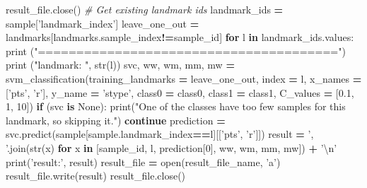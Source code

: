 \documentclass[10pt,letterpaper]{article}
\newenvironment{Shaded}{\begin{snugshade}}{\end{snugshade}}
\newcommand{\DecValTok}[1]{\textcolor[rgb]{0.00,0.00,0.81}{{#1}}}
\newcommand{\FloatTok}[1]{\textcolor[rgb]{0.00,0.00,0.81}{{#1}}}
\newcommand{\CharTok}[1]{\textcolor[rgb]{0.31,0.60,0.02}{{#1}}}
\newcommand{\StringTok}[1]{\textcolor[rgb]{0.31,0.60,0.02}{{#1}}}
\newcommand{\CommentTok}[1]{\textcolor[rgb]{0.56,0.35,0.01}{\textit{{#1}}}}
\newcommand{\VariableTok}[1]{\textcolor[rgb]{0.00,0.00,0.00}{{#1}}}
\newcommand{\ControlFlowTok}[1]{\textcolor[rgb]{0.13,0.29,0.53}{\textbf{{#1}}}}
\newcommand{\OperatorTok}[1]{\textcolor[rgb]{0.81,0.36,0.00}{\textbf{{#1}}}}
\newcommand{\BuiltInTok}[1]{{#1}}
\newcommand{\NormalTok}[1]{{#1}}
\begin{document}
\begin{Shaded}
\begin{Highlighting}[]
    \NormalTok{result_file.close()}
    \CommentTok{# Get existing landmark ids}
    \NormalTok{landmark_ids }\OperatorTok{=} \NormalTok{sample[}\StringTok{'landmark_index'}\NormalTok{]}
    \NormalTok{leave_one_out }\OperatorTok{=} \NormalTok{landmarks[landmarks.sample_index}\OperatorTok{!=}\NormalTok{sample_id]}
    \ControlFlowTok{for} \NormalTok{l }\OperatorTok{in} \NormalTok{landmark_ids.values:}
        \BuiltInTok{print} \NormalTok{(}\StringTok{"======================================="}\NormalTok{)}
        \BuiltInTok{print} \NormalTok{(}\StringTok{"landmark: "}\NormalTok{, }\BuiltInTok{str}\NormalTok{(l))}
        \NormalTok{svc, ww, wm, mm, mw }\OperatorTok{=} \NormalTok{svm_classification(training_landmarks }\OperatorTok{=} \NormalTok{leave_one_out,}
                                                 \NormalTok{index }\OperatorTok{=} \NormalTok{l,}
                                                 \NormalTok{x_names }\OperatorTok{=} \NormalTok{[}\StringTok{'pts'}\NormalTok{, }\StringTok{'r'}\NormalTok{],}
                                                 \NormalTok{y_name }\OperatorTok{=} \StringTok{'stype'}\NormalTok{,}
                                                 \NormalTok{class0 }\OperatorTok{=} \NormalTok{class0,}
                                                 \NormalTok{class1 }\OperatorTok{=} \NormalTok{class1,}
                                                 \NormalTok{C_values }\OperatorTok{=} \NormalTok{[}\FloatTok{0.1}\NormalTok{, }\DecValTok{1}\NormalTok{, }\DecValTok{10}\NormalTok{])}
        \ControlFlowTok{if} \NormalTok{(svc }\OperatorTok{is} \VariableTok{None}\NormalTok{):}
            \BuiltInTok{print}\NormalTok{(}\StringTok{"One of the classes have too few samples for this landmark, so skipping it."}\NormalTok{)}
            \ControlFlowTok{continue}
        \NormalTok{prediction }\OperatorTok{=} \NormalTok{svc.predict(sample[sample.landmark_index}\OperatorTok{==}\NormalTok{l][[}\StringTok{'pts'}\NormalTok{, }\StringTok{'r'}\NormalTok{]])}
        \NormalTok{result }\OperatorTok{=} \StringTok{', '}\NormalTok{.join(}\BuiltInTok{str}\NormalTok{(x) }\ControlFlowTok{for} \NormalTok{x }\OperatorTok{in} \NormalTok{[sample_id, l, prediction[}\DecValTok{0}\NormalTok{], ww, wm, mm, mw]) }\OperatorTok{+} \StringTok{'}\CharTok{\textbackslash{}n}\StringTok{'}
        \BuiltInTok{print}\NormalTok{(}\StringTok{'result:'}\NormalTok{, result)}
        \NormalTok{result_file }\OperatorTok{=} \BuiltInTok{open}\NormalTok{(result_file_name, }\StringTok{'a'}\NormalTok{)}
        \NormalTok{result_file.write(result)}
        \NormalTok{result_file.close()}
\end{Highlighting}
\end{Shaded}
\end{document}
